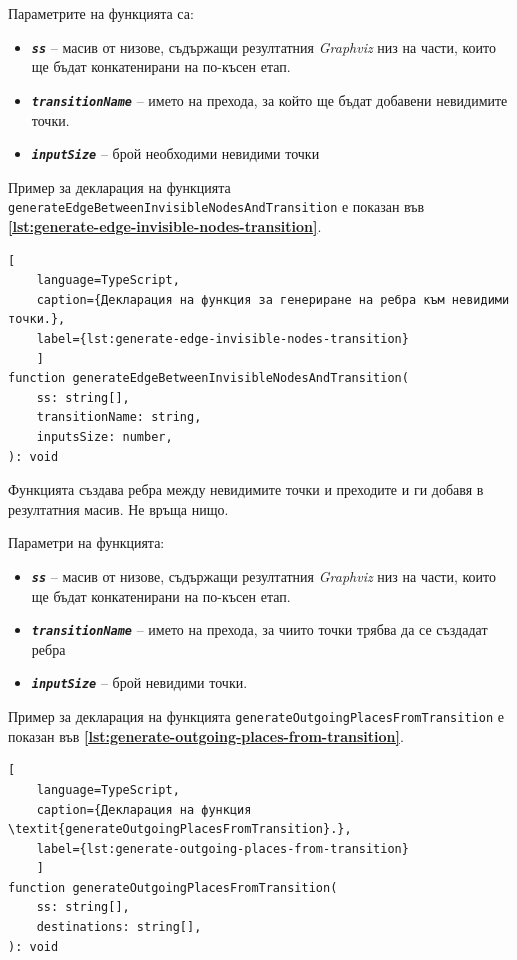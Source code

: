 Параметрите на функцията са:

\vspace{-0.3cm}

\begin{itemize}
	\item \texttt{\textbf{\textit{ss}}} -- масив от низове, съдържащи резултатния \textit{Graphviz} низ на части, които ще бъдат конкатенирани на по-късен етап.
	\item \texttt{\textbf{\textit{transitionName}}} -- името на прехода, за който ще бъдат добавени невидимите точки.
	\item \texttt{\textbf{\textit{inputSize}}} -- брой необходими невидими точки
\end{itemize}

\vspace{0.55cm}

Пример за декларация на функцията \texttt{generateEdge\-Between\-Invisible\-Nodes\-And\-Transition} е показан във \textbf{\autoref{lst:generate-edge-invisible-nodes-transition}}.
\begin{lstlisting}[
	language=TypeScript,
	caption={Декларация на функция за генериране на ребра към невидими точки.},
	label={lst:generate-edge-invisible-nodes-transition}
	]
function generateEdgeBetweenInvisibleNodesAndTransition(
    ss: string[],
    transitionName: string,
    inputsSize: number,
): void
\end{lstlisting}

Функцията създава ребра между невидимите точки и преходите и ги добавя в резултатния масив. Не връща нищо.

Параметри на функцията:

\vspace{-0.3cm}

\begin{itemize}
	\item \texttt{\textbf{\textit{ss}}} -- масив от низове, съдържащи резултатния \textit{Graphviz} низ на части, които ще бъдат конкатенирани на по-късен етап.
	\item \texttt{\textbf{\textit{transitionName}}} -- името на прехода, за чиито точки трябва да се създадат ребра
	\item \texttt{\textbf{\textit{inputSize}}} -- брой невидими точки.
\end{itemize}

\vspace{0.55cm}

Пример за декларация на функцията \texttt{generateOutgoingPlacesFromTransition} е показан във \textbf{\autoref{lst:generate-outgoing-places-from-transition}}.
\begin{lstlisting}[
	language=TypeScript,
	caption={Декларация на функция \textit{generateOutgoingPlacesFromTransition}.},
	label={lst:generate-outgoing-places-from-transition}
	]
function generateOutgoingPlacesFromTransition(
    ss: string[],
    destinations: string[],
): void
\end{lstlisting}

